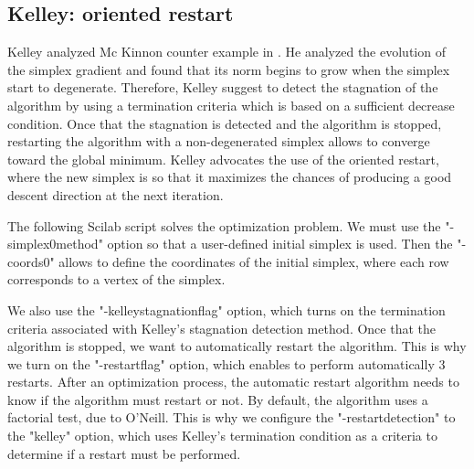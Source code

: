 \subsection{Kelley: oriented restart}

Kelley analyzed Mc Kinnon counter example in \cite{Kelley1999}.
He analyzed the evolution of the simplex gradient and found that 
its norm begins to grow when the simplex start to degenerate.
Therefore, Kelley suggest to detect the stagnation of the algorithm
by using a termination criteria which is based on a sufficient decrease 
condition. Once that the stagnation is detected and the algorithm is stopped,
restarting the algorithm with a non-degenerated simplex allows to 
converge toward the global minimum. Kelley advocates the use of the oriented 
restart, where the new simplex is so that it maximizes the chances of 
producing a good descent direction at the next iteration.

The following Scilab script solves the optimization problem.
We must use the "-simplex0method" option so that a 
user-defined initial simplex is used. Then the 
"-coords0" allows to define the coordinates of the initial 
simplex, where each row corresponds to a vertex of the simplex.

We also use the "-kelleystagnationflag" option, which turns on 
the termination criteria associated with Kelley's stagnation
detection method. Once that the algorithm is stopped, we want 
to automatically restart the algorithm. This is why we 
turn on the "-restartflag" option, which enables to perform 
automatically 3 restarts. After an optimization process, the 
automatic restart algorithm needs to know if the algorithm
must restart or not. By default, the algorithm uses a 
factorial test, due to O'Neill. This is why we configure the 
"-restartdetection" to the "kelley" option, which uses Kelley's 
termination condition as a criteria to determine 
if a restart must be performed.

